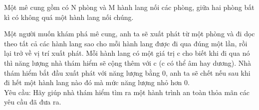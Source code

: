 Một mê cung gồm có N phòng và M hành lang nối các phòng, giữa hai phòng bất kì có không quá một hành lang nối chúng.

Một người muốn khám phá mê cung, anh ta sẽ xuất phát từ một phòng và đi dọc theo tất cả các hành lang sao cho mỗi hành lang được đi qua đúng một lần, rồi lại trở về vị trí xuất phát. Mỗi hành lang có một giá trị c cho biết khi đi qua nó thì năng lượng nhà thám hiểm sẽ cộng thêm với c (c có thể âm hay dương). Nhà thám hiểm bắt đầu xuất phát với năng lượng bằng 0, anh ta sẽ chết nếu sau khi đi hết một hành lang nào đó mà mức năng lượng nhỏ hơn 0.
\\Yêu cầu: Hãy giúp nhà thám hiểm tìm ra một hành trình an toàn thỏa mãn các yêu cầu đã đưa ra.
